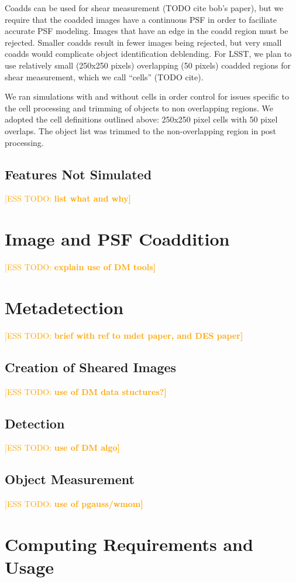 \documentclass[iop, twocolappendix, appendixfloats, numberedappendix, apj]{hackemulateapj}
\newcommand{\esstodo}[1]{\textcolor{orange}{[ESS TODO: \bf #1]}}
\begin{document}
Coadds can be used for shear measurement (TODO cite bob's paper), but we
require that the coadded images have a continuous PSF in order to faciliate
accurate PSF modeling.  Images that have an edge in the coadd region must be
rejected.  Smaller coadds result in fewer images being rejected, but very small
coadds would complicate object identification deblending.  For LSST, we plan to
use relatively small (250x250 pixels) overlapping (50 pixels) coadded regions
for shear measurement, which we call ``cells'' (TODO cite).

We ran simulations with and without cells in order control for issues specific
to the cell processing and trimming of objects to non overlapping regions.  We
adopted the cell definitions outlined above: 250x250 pixel cells with 50 pixel
overlaps. The object list was trimmed to the non-overlapping region in post
processing.

\subsection{Features Not Simulated} \label{sec:notincluded}
\esstodo{list what and why}

\section{Image and PSF Coaddition} \label{sec:coadding}
\esstodo{explain use of DM tools}

\section{Metadetection} \label{sec:mdet}
\esstodo{brief with ref to mdet paper, and DES paper}

\subsection{Creation of Sheared Images} \label{sec:mdet:sheared}
\esstodo{use of DM data stuctures?}
\subsection{Detection} \label{sec:mdet:detect}
\esstodo{use of DM algo}
\subsection{Object Measurement} \label{sec:mdet:meas}
\esstodo{use of pgauss/wmom}

\section{Computing Requirements and Usage} \label{sec:timing}
\end{document}
